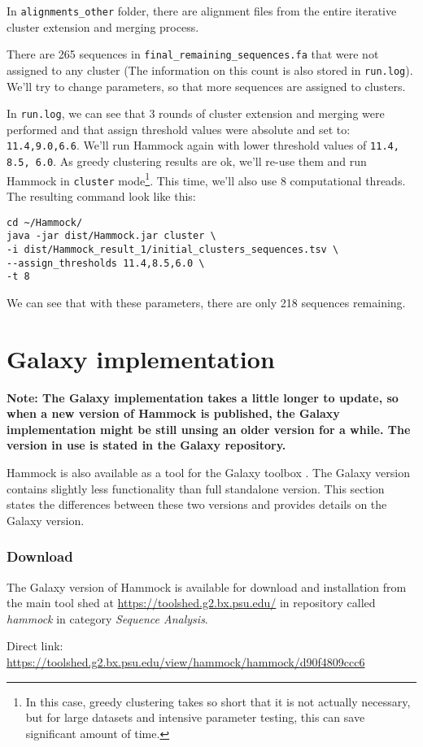 \documentclass[11pt, a4paper, twoside, titlepage]{article}
\begin{document}
In \texttt{alignments\_other} folder, there are alignment files from the entire iterative cluster extension and merging process.

There are 265 sequences in \texttt{final\_remaining\_sequences.fa} that were not assigned to any cluster (The information on this count is also stored in \texttt{run.log}). We'll try to change parameters, so that more sequences are assigned to clusters.

In \texttt{run.log}, we can see that 3 rounds of cluster extension and merging were performed and that assign threshold values were absolute and set to: \texttt{11.4,9.0,6.6}. We'll run Hammock again with lower threshold values of \texttt{11.4, 8.5, 6.0}. As greedy clustering results are ok, we'll re-use them and run Hammock in \texttt{cluster} mode\footnote{In this case, greedy clustering takes so short that it is not actually necessary, but for large datasets and intensive parameter testing, this can save significant amount of time.}. This time, we'll also use 8 computational threads. The resulting command look like this: 

\begin{verbatim}
cd ~/Hammock/
java -jar dist/Hammock.jar cluster \ 
-i dist/Hammock_result_1/initial_clusters_sequences.tsv \ 
--assign_thresholds 11.4,8.5,6.0 \ 
-t 8
\end{verbatim}

We can see that with these parameters, there are only 218 sequences remaining.


\section{Galaxy implementation}

\large\textbf{Note: The Galaxy implementation takes a little longer to update, so when a new version of Hammock is published, the Galaxy implementation might be still unsing an older version for a while. The version in use is stated in the Galaxy repository.}
\newline
\newline

Hammock is also available as a tool for the Galaxy toolbox \cite{Giardine2005}. The Galaxy version contains slightly less functionality than full standalone version. This section states the differences between these two versions and provides details on the Galaxy version. 

\subsubsection{Download}
\begin{sloppypar}
The Galaxy version of Hammock is available for download and installation from the main tool shed at \mbox{\url{https://toolshed.g2.bx.psu.edu/}} in repository called \emph{hammock} in category \emph{Sequence Analysis}.

Direct link: \mbox{\url{https://toolshed.g2.bx.psu.edu/view/hammock/hammock/d90f4809ccc6}}

\end{sloppypar}
\end{document}
